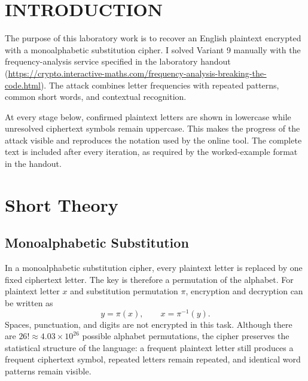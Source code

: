 \documentclass[12pt,a4paper]{article}
\begin{document}
\setcounter{page}{2}

\tableofcontents
\newpage

\section*{INTRODUCTION}
The purpose of this laboratory work is to recover an English plaintext encrypted with a monoalphabetic substitution cipher. I solved Variant 9 manually with the frequency-analysis service specified in the laboratory handout (\url{https://crypto.interactive-maths.com/frequency-analysis-breaking-the-code.html}). The attack combines letter frequencies with repeated patterns, common short words, and contextual recognition.

At every stage below, confirmed plaintext letters are shown in lowercase while unresolved ciphertext symbols remain uppercase. This makes the progress of the attack visible and reproduces the notation used by the online tool. The complete text is included after every iteration, as required by the worked-example format in the handout.

\newpage

\section{Short Theory}
\subsection{Monoalphabetic Substitution}
In a monoalphabetic substitution cipher, every plaintext letter is replaced by one fixed ciphertext letter. The key is therefore a permutation of the alphabet. For plaintext letter $x$ and substitution permutation $\pi$, encryption and decryption can be written as
\begin{equation}
y = \pi(x), \qquad x = \pi^{-1}(y).
\end{equation}
Spaces, punctuation, and digits are not encrypted in this task. Although there are $26! \approx 4.03 \times 10^{26}$ possible alphabet permutations, the cipher preserves the statistical structure of the language: a frequent plaintext letter still produces a frequent ciphertext symbol, repeated letters remain repeated, and identical word patterns remain visible.
\end{document}
